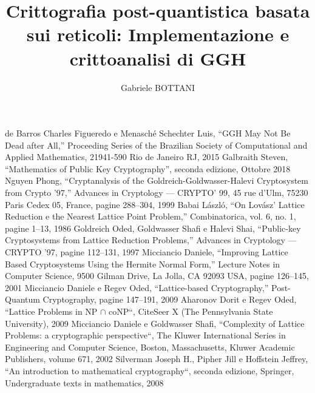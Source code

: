 \documentclass[a4paper,12pt]{report}
\theoremstyle{definition}
\begin{document}
\title{Crittografia post-quantistica basata sui reticoli: Implementazione e crittoanalisi di GGH}
\author{Gabriele BOTTANI}

% 
%
\beforepreface
\afterpreface
% 
% 

%

%

%

%
%
\begin{thebibliography}{}
    de Barros Charles Figueredo e Menasché Schechter Luis, “GGH May Not Be Dead after All,” 
    Proceeding Series of the Brazilian Society of Computational and Applied Mathematics, 
    21941-590 Rio de Janeiro RJ, 2015
    Galbraith Steven, “Mathematics of Public Key Cryptography”, seconda edizione, Ottobre 2018
    Nguyen Phong, “Cryptanalysis of the Goldreich-Goldwasser-Halevi Cryptosystem from 
    Crypto ’97,” Advances in Cryptology — CRYPTO’ 99, 45 rue d’Ulm, 75230 Paris Cedex 05, 
    France, pagine 288–304, 1999
    Babai László, “On Lovász’ Lattice Reduction e the Nearest Lattice Point Problem,” 
    Combinatorica, vol. 6, no. 1, pagine 1–13, 1986
    Goldreich Oded, Goldwasser Shafi e Halevi Shai,  “Public-key Cryptosystems from 
    Lattice Reduction Problems,” Advances in Cryptology — CRYPTO ’97, pagine 112–131, 1997
    Micciancio Daniele,  “Improving Lattice Based Cryptosystems Using the Hermite 
    Normal Form,” Lecture Notes in Computer Science, 9500 Gilman Drive, La Jolla, 
    CA 92093 USA, pagine 126–145, 2001
    Micciancio Daniele e Regev Oded, “Lattice-based Cryptography,” Post-Quantum 
    Cryptography, pagine 147–191, 2009
    Aharonov Dorit e Regev Oded, “Lattice Problems in NP $\cap$ coNP“, 
    CiteSeer X (The Pennsylvania State University), 2009
    Micciancio Daniele e Goldwasser Shafi, 
    “Complexity of Lattice Problems: a cryptographic perspective“,
    The Kluwer International Series in Engineering and Computer Science, Boston, Massachusetts,
    Kluwer Academic Publishers, volume 671, 2002
    Silverman Joseph H., Pipher Jill e Hoffstein Jeffrey, “An introduction to mathematical cryptography“,
    seconda edizione, Springer, Undergraduate texts in mathematics, 2008

\end{thebibliography}
\end{document}
